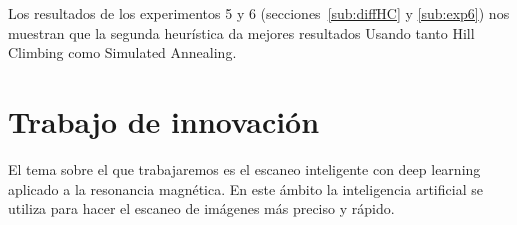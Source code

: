 Los resultados de los experimentos 5 y 6 (secciones~\ref{sub:diffHC} y \ref{sub:exp6}) nos muestran que
la segunda heurística da mejores resultados Usando tanto Hill Climbing como Simulated Annealing.









\pagebreak
\appendix
\section{Trabajo de innovación}

El tema sobre el que trabajaremos es el escaneo inteligente con deep learning aplicado a la resonancia magnética. En este ámbito la inteligencia artificial se utiliza para hacer el escaneo de imágenes más preciso y rápido.

